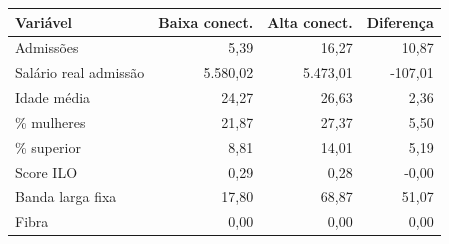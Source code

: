 \scriptsize
\begin{tabular}{lrrr}
\toprule
Variável & Baixa conect. & Alta conect. & Diferença \\
\midrule
Admissões & 5,39 & 16,27 & 10,87 \\
Salário real admissão & 5.580,02 & 5.473,01 & -107,01 \\
Idade média & 24,27 & 26,63 & 2,36 \\
\% mulheres & 21,87 & 27,37 & 5,50 \\
\% superior & 8,81 & 14,01 & 5,19 \\
Score ILO & 0,29 & 0,28 & -0,00 \\
Banda larga fixa & 17,80 & 68,87 & 51,07 \\
Fibra & 0,00 & 0,00 & 0,00 \\
\bottomrule
\end{tabular}
